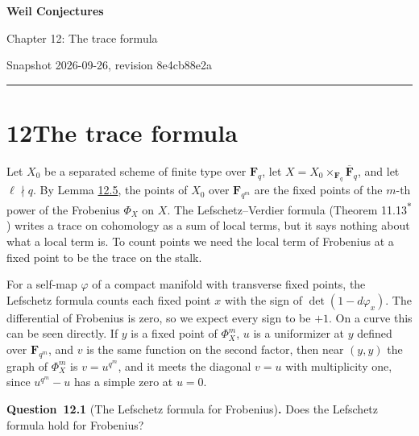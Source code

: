 \documentclass[11pt]{article}
\newenvironment{bpstatement}[2]{\par\addvspace{0.6\baselineskip}\noindent\textbf{#1}#2\textbf{.}\enspace\ignorespaces}
  {\par\addvspace{0.4\baselineskip}}
\newcommand{\bpout}[1]{#1\textsuperscript{\hyperlink{bp-outside}{\ensuremath{\ast}}}}
\begin{document}
\pagestyle{plain}
\begin{center}
{\LARGE\bfseries Weil Conjectures\par}
\vspace{0.7em}
{\large Chapter 12: The trace formula\par}
\vspace{0.5em}
{\small\color{bpmuted}Snapshot 2026-09-26, revision 8e4cb88e2a\par}
\end{center}
\vspace{0.5em}
{\small\tableofcontents}
\bigskip\hrule\bigskip

\section*{\texorpdfstring{12\quad The trace formula}{12 The trace formula}}
\label{bp1}%
\label{bp2}%
Let \(X_0\) be a separated scheme of finite type over \(\mathbf F_q\), let \(X=X_0\times_{\mathbf F_q}\overline{\mathbf F}_q\), and let \(\ell\nmid q\). By Lemma \hyperref[bp15]{12.5}, the points of \(X_0\) over \(\mathbf F_{q^m}\) are the fixed points of the \(m\)-th power of the Frobenius \(\Phi_X\) on \(X\). The Lefschetz–Verdier formula (Theorem \bpout{11.13}) writes a trace on cohomology as a sum of local terms, but it says nothing about what a local term is. To count points we need the local term of Frobenius at a fixed point to be the trace on the stalk.

For a self-map \(\varphi\) of a compact manifold with transverse fixed points, the Lefschetz formula counts each fixed point \(x\) with the sign of \(\det(1-d\varphi_x)\). The differential of Frobenius is zero, so we expect every sign to be \(+1\). On a curve this can be seen directly. If \(y\) is a fixed point of \(\Phi_X^m\), \(u\) is a uniformizer at \(y\) defined over \(\mathbf F_{q^m}\), and \(v\) is the same function on the second factor, then near \((y,y)\) the graph of \(\Phi_X^m\) is \(v=u^{q^m}\), and it meets the diagonal \(v=u\) with multiplicity one, since \(u^{q^m}-u\) has a simple zero at \(u=0\).

\label{bp3}%
\begin{bpstatement}{Question~12.1}{ (The Lefschetz formula for Frobenius)}
Does the Lefschetz formula hold for Frobenius?
\end{bpstatement}
\end{document}
